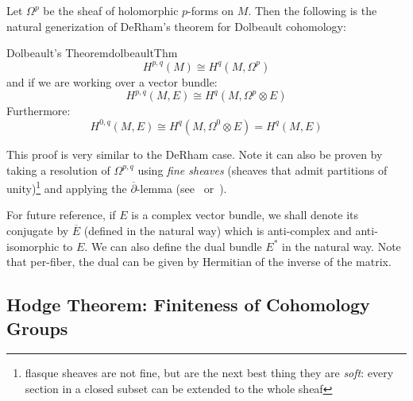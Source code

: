 \documentclass{book}
\newenvironment{Proof}[1][]
  {\begin{ProofTcb}[#1]}
  {\end{ProofTcb}}
\begin{document}
Let $\Omega^p$ be the sheaf of holomorphic $p$-forms on $M$. Then the following is the natural
generization of DeRham's theorem for Dolbeault cohomology:
\begin{thm}{Dolbeault's Theorem}{dolbeaultThm}
  \[
  H^{p,q}(M) \cong H^q(M, \Omega^p)
\]
and if we are working over a vector bundle:
\[
  H^{p,q}(M, E) \cong H^q(M, \Omega^p\otimes E)
\]
Furthermore:
\[
  H^{0,q}(M, E) \cong H^q(M, \Omega^0\otimes E) = H^q(M, E)
\]
\end{thm}

\begin{Proof}
  This proof is very similar to the DeRham case. Note it can also be proven by taking a resolution of
  $\Omega^{p,q}$ using \emph{fine sheaves} (sheaves that admit partitions of unity)\footnote{flasque sheaves are
  not fine, but are the next best thing they are \emph{soft}: every section in a closed subset can be extended
  to the whole sheaf} and applying the $\overline{\partial}$-lemma
  (see~\cite{gallierComplexAlgebraicGeometry2011} or~\cite[section~15.4]{hirzebruchTopologicalMethodsAlgebraic1995}).
\end{Proof}

For future reference, if $E$ is a complex vector bundle, we shall denote its conjugate by $\overline{E}$
(defined in the natural way) which is anti-complex and anti-isomorphic to $E$. We can also define the dual
bundle $E^*$ in the natural way. Note that per-fiber, the dual can be given by Hermitian of the inverse of the
matrix.

\subsection*{Hodge Theorem: Finiteness of Cohomology Groups}
\end{document}
